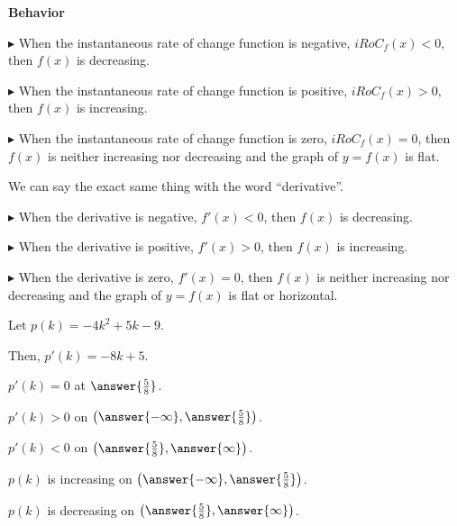 \documentclass{ximera}
\begin{document}
\begin{conclusion}  \textbf{\textcolor{green!25!black}{Behavior}}

$\blacktriangleright$ When the instantaneous rate of change function is negative, $iRoC_f(x) < 0$, then $f(x)$ is decreasing. 

$\blacktriangleright$ When the instantaneous rate of change function is positive, $iRoC_f(x) > 0$, then $f(x)$ is increasing. 

$\blacktriangleright$ When the instantaneous rate of change function is zero, $iRoC_f(x) = 0$, then $f(x)$ is neither increasing nor decreasing and the graph of $y = f(x)$ is flat. 


We can say the exact same thing with the word ``derivative''. 



$\blacktriangleright$ When the derivative is negative, $f'(x) < 0$, then $f(x)$ is decreasing. 

$\blacktriangleright$ When the derivative is positive, $f'(x) > 0$, then $f(x)$ is increasing. 

$\blacktriangleright$ When the derivative is zero, $f'(x) = 0$, then $f(x)$ is neither increasing nor decreasing and the graph of $y = f(x)$ is flat or horizontal. 



\end{conclusion}





\begin{question} 



Let $p(k) = -4 k^2 + 5 k - 9$.

Then, $p'(k) = -8 k + 5$.

$p'(k) = 0$ at $\answer{\frac{5}{8}}$.

$p'(k) > 0$ on $\left( \answer{-\infty}  , \answer{\frac{5}{8}}  \right)$.

$p'(k) < 0$ on $\left( \answer{\frac{5}{8}} , \answer{\infty} \right)$.

$p(k)$ is increasing on $\left( \answer{-\infty}  , \answer{\frac{5}{8}}  \right)$.

$p(k)$ is decreasing on $\left( \answer{\frac{5}{8}} , \answer{\infty} \right)$.

\end{question}
\end{document}

